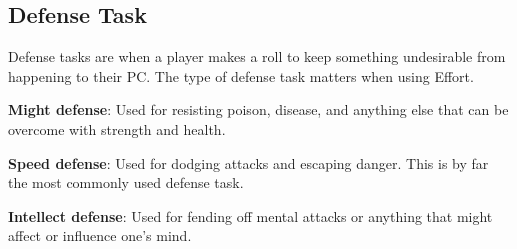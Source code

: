 \begin{multicols}{2}
\subsection{Defense Task}

Defense tasks are when a player makes a roll to keep something undesirable from happening to their PC. The type of defense task matters when using Effort.

\textbf{Might defense}: Used for resisting poison, disease, and anything else that can be overcome with strength and health.

\textbf{Speed defense}: Used for dodging attacks and escaping danger. This is by far the most commonly used defense task.

\textbf{Intellect defense}: Used for fending off mental attacks or anything that might affect or influence one’s mind.

\end{multicols}
